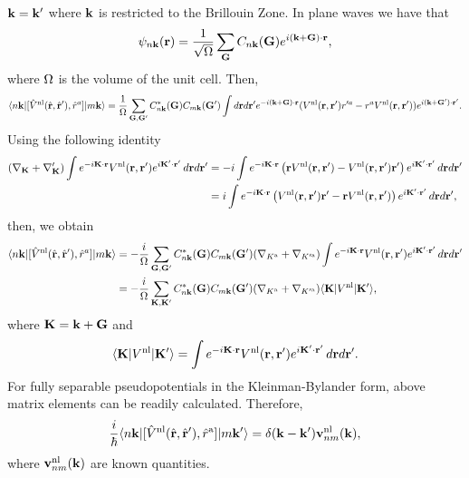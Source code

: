 $\mathbf{k}=\mathbf{k}'$ where $\mathbf{k}$ is restricted to the Brillouin Zone.
In plane waves we have that
\begin{align}\label{cn3}
\psi_{n\mathbf{k}}(\mathbf{r})=\frac{1}{\sqrt{\Omega}}
\sum_{\mathbf{G}} C_{n\mathbf{k}}(\mathbf{G})e^{i(\mathbf{k}+\mathbf{G})\cdot\mathbf{r}}
,
\end{align}
where $\Omega$ is the volume of the unit cell.
Then,
\begin{align}\label{cn4}
\langle n\mathbf{k} |[\hat V^{\mathrm{nl}}(\hat{\mathbf{r}},\hat{\mathbf{r}}'),\hat r^a]| m\mathbf{k} \rangle
&=
\frac{1}{\Omega}
\sum_{\mathbf{G},\mathbf{G}'} 
C^*_{n\mathbf{k}}(\mathbf{G}) 
C_{m\mathbf{k}}(\mathbf{G}')
\int d\mathbf{r} d\mathbf{r}' 
e^{-i(\mathbf{k}+\mathbf{G})\cdot \mathbf{r}}
 ( 
V^{\mathrm{nl}}(\mathbf{r},\mathbf{r}') r'^a 
- 
r^aV^{\mathrm{nl}}(\mathbf{r},\mathbf{r}')
) 
e^{i(\mathbf{k}+\mathbf{G}')\cdot \mathbf{r}'}
.
\nonumber\\
\end{align} 
Using the following identity 
\begin{align}\label{cn51}
(\nabla_{\mathbf{K}}+\nabla_{\mathbf{K}}')
\int e^{-i\mathbf{K}\cdot\mathbf{r}}
V^{\mathrm{nl}}(\mathbf{r},\mathbf{r}')
e^{i\mathbf{K}'\cdot\mathbf{r}'}
\,d\mathbf{r} d\mathbf{r}'
&=
-i
\int e^{-i\mathbf{K}\cdot\mathbf{r}}
\left(
\mathbf{r}
V^{\mathrm{nl}}(\mathbf{r},\mathbf{r}')
-
V^{\mathrm{nl}}(\mathbf{r},\mathbf{r}')
\mathbf{r}'
\right)
e^{i\mathbf{K}'\cdot\mathbf{r}'}
\,d\mathbf{r} d\mathbf{r}'
\nonumber\\
&=
i
\int e^{-i\mathbf{K}\cdot\mathbf{r}}
\left(
V^{\mathrm{nl}}(\mathbf{r},\mathbf{r}')
\mathbf{r}'
-
\mathbf{r}
 V^{\mathrm{nl}}(\mathbf{r},\mathbf{r}')
\right)
e^{i\mathbf{K}'\cdot\mathbf{r}'}
\,d\mathbf{r} d\mathbf{r}'
,
\nonumber\\
\end{align}
then, we obtain
\begin{align}\label{cn52}
\langle n\mathbf{k} |[\hat V^{\mathrm{nl}}(\hat{\mathbf{r}},\hat{\mathbf{r}}'),\hat r^a]| m\mathbf{k} \rangle
&=
-\frac{i}{\Omega}
\sum_{\mathbf{G},\mathbf{G}'}
C^*_{n\mathbf{k}}(\mathbf{G})
C_{m\mathbf{k}}(\mathbf{G}')
(\nabla_{K^{\mathrm{a}}}+\nabla_{K'^{\mathrm{a}}})
\int e^{-i\mathbf{K}\cdot\mathbf{r}}
V^{\mathrm{nl}}(\mathbf{r},\mathbf{r}')
e^{i\mathbf{K}'\cdot\mathbf{r}'}
\,d\mathbf{r} d\mathbf{r}'
\nonumber\\
&=
-\frac{i}{\Omega}
\sum_{\mathbf{K},\mathbf{K}'}
C^*_{n\mathbf{k}}(\mathbf{G})
C_{m\mathbf{k}}(\mathbf{G}')
(\nabla_{K^{\mathrm{a}}}+\nabla_{K'^{\mathrm{a}}})
\langle \mathbf{K} | 
V^{\mathrm{nl}}
| \mathbf{K}' \rangle 
,
\end{align}
where $\mathbf{K}=\mathbf{k}+\mathbf{G}$ and
\begin{align}\label{cn6}
\langle \mathbf{K} | 
V^{\mathrm{nl}}
| \mathbf{K}' \rangle 
=
\int e^{-i\mathbf{K}\cdot\mathbf{r}}
V^{\mathrm{nl}}(\mathbf{r},\mathbf{r}')
e^{i\mathbf{K}'\cdot\mathbf{r}'}
\,d\mathbf{r} d\mathbf{r}'
.
\end{align}
For fully  separable pseudopotentials in the 
Kleinman-Bylander form,\cite{mottaCMS10,kleinman_efficacious_1982,adolphPRB96}
above matrix elements 
can be readily calculated.\cite{francesco}
Therefore,
\begin{align}\label{cn8}
\frac{i}{\hbar}
\langle n\mathbf{k} |[\hat V^{\mathrm{nl}}(\hat{\mathbf{r}},\hat{\mathbf{r}}'),\hat r^{\mathrm{a}}]| m\mathbf{k}' \rangle
=\delta(\mathbf{k}-\mathbf{k}') \mathbf{v}^{\mathrm{nl}}_{nm}(\mathbf{k})
,
\end{align}
where $\mathbf{v}^{\mathrm{nl}}_{nm}(\mathbf{k})$ are known quantities.


